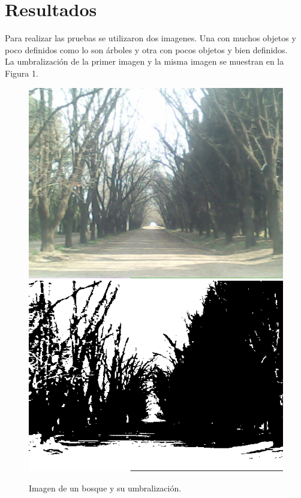 \documentclass[conference]{IEEEtran}
\begin{document}




\section{Resultados}
Para realizar las pruebas se utilizaron dos imagenes. Una con muchos objetos y poco definidos como lo son \'arboles y otra con pocos objetos y bien definidos.\\
La umbralizaci\'on de la primer imagen y la misma imagen se muestran en la Figura 1.
\begin{figure}[h]
	\begin{center}
		\setlength{\unitlength}{0.00105in}
		\includegraphics[scale=0.20]{./images/forest.jpg}
		\includegraphics[scale=0.2678]{./images/IMG2.png}
	\end{center}
	\caption{Imagen de un bosque y su umbralizaci\'on.}
\end{figure}
\end{document}
